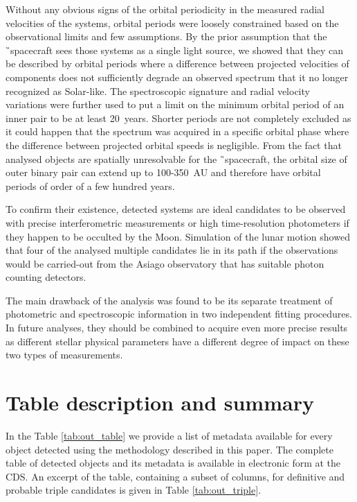 Without any obvious signs of the orbital periodicity in the measured radial velocities of the systems, orbital periods were loosely constrained based on the observational limits and few assumptions. By the prior assumption that the \G\ spacecraft sees those systems as a single light source, we showed that they can be described by orbital periods where a difference between projected velocities of components does not sufficiently degrade an observed spectrum that it no longer recognized as Solar-like. The spectroscopic signature and radial velocity variations were further used to put a limit on the minimum orbital period of an inner pair to be at least 20~years. Shorter periods are not completely excluded as it could happen that the spectrum was acquired in a specific orbital phase where the difference between projected orbital speeds is negligible. From the fact that analysed objects are spatially unresolvable for the \G\ spacecraft, the orbital size of outer binary pair can extend up to 100-350~AU and therefore have orbital periods of order of a few hundred years.

To confirm their existence, detected systems are ideal candidates to be observed with precise interferometric measurements or high time-resolution photometers if they happen to be occulted by the Moon. Simulation of the lunar motion showed that four of the analysed multiple candidates lie in its path if the observations would be carried-out from the Asiago observatory that has suitable photon counting detectors.

The main drawback of the analysis was found to be its separate treatment of photometric and spectroscopic information in two independent fitting procedures. In future analyses, they should be combined to acquire even more precise results as different stellar physical parameters have a different degree of impact on these two types of measurements.


\section{Table description and summary}
\label{sec:outres}

In the Table \ref{tab:out_table} we provide a list of metadata available for every object detected using the methodology described in this paper. The complete table of detected objects and its metadata is available in electronic form at the CDS. An excerpt of the table, containing a subset of columns, for definitive and probable triple candidates is given in Table \ref{tab:out_triple}.

